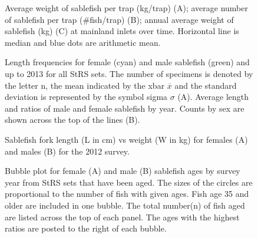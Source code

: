 \documentclass[12pt]{article}\usepackage[]{graphicx}\usepackage[]{color}
\begin{document}
\begin{figure}[htb]

{\centering {} 

}

\caption{Average weight of sablefish per trap (kg/trap) (A); average number of sablefish per trap (\#fish/trap) (B); annual average weight of sablefish (kg) (C) at mainland inlets over time. Horizontal line is median and blue dots are arithmetic mean.}\label{fig:figure10}
\end{figure}
\clearpage


\begin{figure}[htb]

{\centering {} 

}

\caption{Length frequencies for female (cyan) and male sablefish (green) and up to 2013 for all StRS sets. The number of specimens is denoted by the letter n, the mean indicated by the xbar \(\overline{x}\) and the standard deviation is represented by the symbol sigma \(\sigma\) (A). Average length and ratios of male and female sablefish by year. Counts by sex are shown across the top of the lines (B).}\label{fig:figure11}
\end{figure}
\clearpage


\begin{figure}[htb]

{\centering {} 

}

\caption{Sablefish fork length (L in cm) vs weight (W in kg) for females (A) and males (B) for the 2012 survey.}\label{fig:figure12}
\end{figure}

\begin{figure}[htb]

{\centering {} 

}

\caption{Bubble plot for female (A) and male (B) sablefish ages by survey year from StRS sets that have been aged. The sizes of the circles are proportional to the number of fish with given ages. Fish age 35 and older are included in one bubble. The total number(n) of fish aged are listed across the top of each panel. The ages with the highest ratios are posted to the right of each bubble.}\label{fig:figure13}
\end{figure}
\clearpage
\end{document}
